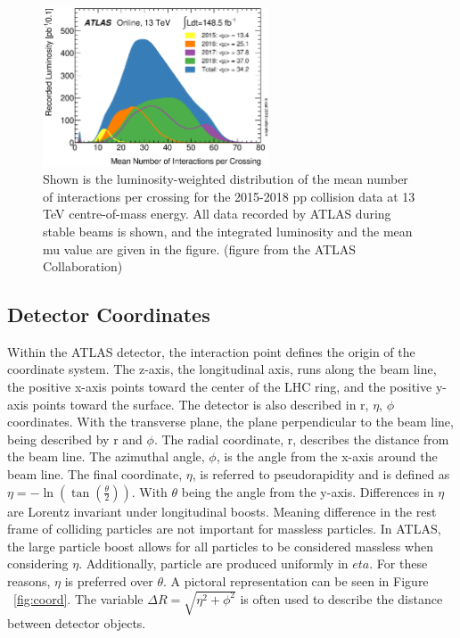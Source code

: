 \begin{figure}[H]
\begin{center}
\includegraphics*[width=0.60\textwidth] {figures/mu_2015_2018}%
\caption[Number of interactions per bunch crossing]{Shown is the luminosity-weighted distribution of the mean number of interactions per crossing for the 2015-2018 pp collision data at 13 TeV centre-of-mass energy. All data recorded by ATLAS during stable beams is shown, and the integrated luminosity and the mean mu value are given in the figure. (figure from the ATLAS Collaboration)}
\label{fig:mu}
\end{center}
\end{figure}

\subsection{Detector Coordinates}
Within the ATLAS detector, the interaction point defines the origin of the coordinate system. The z-axis, the longitudinal axis, runs along the beam line, the positive x-axis points toward the center of the LHC ring, and the positive y-axis points toward the surface. The detector is also described in r, ${\eta}$, ${\phi}$ coordinates. With the transverse plane, the plane perpendicular to the beam line, being described by r and ${\phi}$. The radial coordinate, r, describes the distance from the beam line. The azimuthal angle, ${\phi}$, is the angle from the x-axis around the beam line. The final coordinate, ${\eta}$, is referred to pseudorapidity and is defined as ${\eta = -\ln(\tan(\frac{\theta}{2}))}$. With ${\theta}$ being the angle from the y-axis. Differences in ${\eta}$ are Lorentz invariant under longitudinal boosts. Meaning difference in the rest frame of colliding particles are not important for massless particles. In ATLAS, the large particle boost allows for all particles to be considered massless when considering ${\eta}$. Additionally, particle are produced uniformly in ${eta}$. For these reasons, ${\eta}$ is preferred over ${\theta}$. A pictoral representation can be seen in Figure ~\ref{fig:coord}. The variable ${\Delta{R}=\sqrt{\eta^{2} + \phi^{2}}}$ is often used to describe the distance between detector objects.

